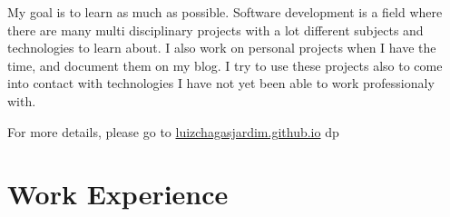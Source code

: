 \documentclass[a4paper,10pt]{article}
\newcommand{\cvtype}{d}
\begin{document}
{\quad}My goal is to learn as much as possible. Software development is a field where there are many multi	disciplinary projects with a lot different subjects and technologies to learn about. I also work on personal projects when I have the time, and document them on my blog. I try to use these projects also to come into contact with technologies I have not yet been able to work professionaly with.

{\quad}\footnotesize{For more details, please go to \href{http://luizchagasjardim.github.io}{luizchagasjardim.github.io}}
\else
	\if \cvtype p

	\fi
\fi

\section{Work Experience}
\end{document}
